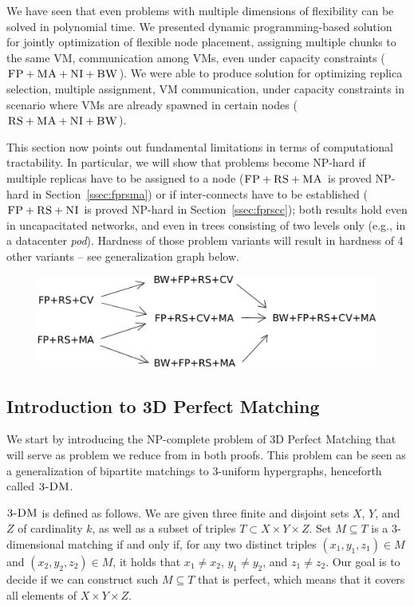 We have seen that even problems with multiple dimensions of
flexibility can be solved in polynomial time. We presented dynamic programming-based solution for
jointly optimization of flexible node placement, assigning multiple
chunks to the same VM, communication among VMs, even under capacity
constraints ($\textsc{FP}+\textsc{MA}+\textsc{NI}+\textsc{BW}$). We were able to produce solution for optimizing replica selection,
multiple assignment, VM communication, under capacity constraints in
scenario where VMs are already spawned in certain nodes ($\textsc{RS}+\textsc{MA}+\textsc{NI}+\textsc{BW}$).



This section now points out fundamental
limitations in terms of computational tractability. In particular, we
will show that problems become NP-hard if multiple replicas have to be
assigned to a node ($\textsc{FP}+\textsc{RS}+\textsc{MA}$ is proved NP-hard in
Section~\ref{ssec:fprsma}) or if inter-connects have to be established
($\textsc{FP}+\textsc{RS}+\textsc{NI}$ is proved NP-hard in Section~\ref{ssec:fprscc}); both
results hold even in uncapacitated networks, and even in trees
consisting of two levels only (e.g., in a
datacenter \emph{pod}). Hardness of those problem variants will result
in hardness of 4 other variants -- see generalization graph below.


\begin{figure}[htbp]
\includegraphics[width = \columnwidth]{figs/np-hierarchy}
\end{figure}



\subsection{Introduction to 3D Perfect Matching}

We start by introducing the NP-complete problem of 3D Perfect Matching
that will serve as problem we reduce from in both proofs. This problem
can be seen as a generalization of bipartite matchings to 3-uniform
hypergraphs, henceforth called $\textsc{3-DM}$.~\cite{3dmatch}

$\textsc{3-DM}$ is defined as follows. We are given three finite and disjoint
sets $X$, $Y$, and $Z$ of cardinality $k$, as well as a subset of triples $T\subset
X \times Y \times Z$.  Set $M \subseteq T$ is a 3-dimensional matching
if and only if, for any two distinct triples $(x_1, y_1, z_1) \in M$
and $(x_2, y_2, z_2) \in M$, it holds that $x_1\neq x_2$, $y_1\neq
y_2$, and $z_1\neq z_2$. Our goal is to decide if we can construct
such $M \subseteq T$ that is perfect, which means that it covers all
elements of $X \times Y \times Z$.

